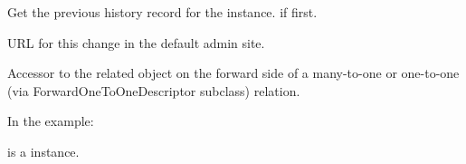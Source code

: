 \documentclass[letterpaper,10pt,english]{sphinxmanual}
\begin{document}
\begin{fulllineitems}

\begin{fulllineitems}
\label{\detokenize{modules/models:users.models.HistoricalWhiteListHistory.prev_record}}
Get the previous history record for the instance.  if first.

\end{fulllineitems}


\begin{fulllineitems}
\label{\detokenize{modules/models:users.models.HistoricalWhiteListHistory.revert_url}}
URL for this change in the default admin site.

\end{fulllineitems}


\begin{fulllineitems}
\label{\detokenize{modules/models:users.models.HistoricalWhiteListHistory.user}}
Accessor to the related object on the forward side of a many-to-one or
one-to-one (via ForwardOneToOneDescriptor subclass) relation.

In the example:

\begin{sphinxVerbatim}[commandchars=\\\{\}]
 
       
\end{sphinxVerbatim}

 is a  instance.

\end{fulllineitems}


\end{fulllineitems}
\end{document}
